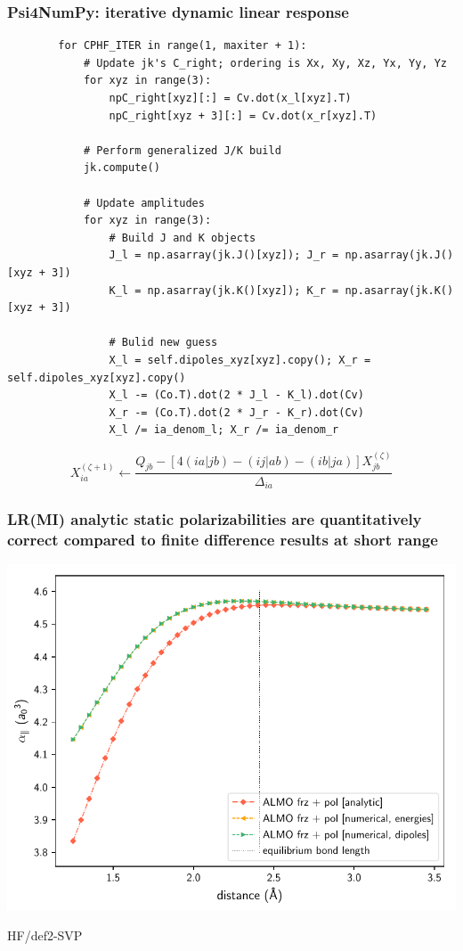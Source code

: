 \documentclass[%
    xcolor=usenames,dvipsnames,svgnames%
]{beamer}
\newenvironment{nscenter}
 {\parskip=0pt\par\nopagebreak\centering}
 {\par\noindent\ignorespacesafterend}
\begin{document}
\begin{frame}[fragile]
  \frametitle{Psi4NumPy: iterative dynamic linear response}
  \begin{verbatim}
        for CPHF_ITER in range(1, maxiter + 1):
            # Update jk's C_right; ordering is Xx, Xy, Xz, Yx, Yy, Yz
            for xyz in range(3):
                npC_right[xyz][:] = Cv.dot(x_l[xyz].T)
                npC_right[xyz + 3][:] = Cv.dot(x_r[xyz].T)

            # Perform generalized J/K build
            jk.compute()

            # Update amplitudes
            for xyz in range(3):
                # Build J and K objects
                J_l = np.asarray(jk.J()[xyz]); J_r = np.asarray(jk.J()[xyz + 3])
                K_l = np.asarray(jk.K()[xyz]); K_r = np.asarray(jk.K()[xyz + 3])

                # Bulid new guess
                X_l = self.dipoles_xyz[xyz].copy(); X_r = self.dipoles_xyz[xyz].copy()
                X_l -= (Co.T).dot(2 * J_l - K_l).dot(Cv)
                X_r -= (Co.T).dot(2 * J_r - K_r).dot(Cv)
                X_l /= ia_denom_l; X_r /= ia_denom_r
  \end{verbatim}
  \begin{equation*}
    X_{ia}^{(\zeta+1)} \leftarrow \frac{Q_{jb} - \left[4(ia|jb) - (ij|ab) - (ib|ja)\right] X_{jb}^{(\zeta)}}{\Delta_{ia}}
  \end{equation*}
\end{frame}

\begin{frame}
  \frametitle{LR(MI) analytic static polarizabilities are quantitatively correct compared to finite difference results at short range}
  \begin{nscenter}
    \includegraphics[scale=0.65]{./figures/almo_analytic_vs_numerical_onaxis_projected_short_def2-SVP.pdf}
  \end{nscenter}
  {\tiny HF/def2-SVP}
\end{frame}
\end{document}

